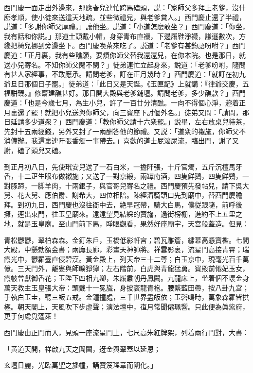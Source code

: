 西門慶一面走出外邊來，那應春兒連忙跨馬磕頭，説：「家師父多拜上老爹，沒什麽孝順，使小徒來送這天地疏，並些微禮兒，與老爹賞人。」西門慶止還了半禮，説道：「多謝你師父厚禮。」讓他坐。説道：「小道怎麽敢坐？」西門慶道：「你坐，我有話和你説。」那道士頭戴小帽，身穿青布直裰，下邊履鞋淨襪，謙遜數次，方纔把椅兒挪到旁邊坐下。西門慶喚茶來吃了。説道：「老爹有甚鈞語吩咐？」西門慶道：「正月裏，我有些醮願，要煩你師父替我還還兒，在你本院。也是那日，就送小兒寄名。不知你師父閑不閑？」徒弟連忙立起身來，説道：「老爹吩咐，隨問有甚人家經事，不敢應承。請問老爹，訂在正月幾時？」西門慶道：「就訂在初九爺旦日那個日子罷。」徒弟道：「此日又是天誕。《玉匣記》上就講：『律爺交慶，五福駢臻。』修齋建醮甚好。那日開大殿與老爹鋪壇。請問老爹，多少醮款？」西門慶道：「也是今歲七月，為生小兒，許了一百廿分清醮。一向不得個心淨，趂着正月裏還了罷！就把小兒送與你師父，向三寳座下討個外名。」徒弟又問：「請問，那日延請多少道衆？」西門慶道：「教你師父請十六衆罷。」説畢，左右放桌兒待茶，先封十五兩經錢，另外又封了一兩酬答他的節禮。又説：「道衆的襯施，你師父不消備辦。我這裏連阡張香燭一事帶去。」喜歡的道士屁滚尿流，臨出門，謝了又謝，磕了頭兒又磕。

到正月初八日，先使玳安兒送了一石白米，一擔阡張，十斤官燭，五斤沉檀馬牙香，十二疋生眼布做襯施；又送了一對京緞，兩罈南酒，四隻鮮鵝，四隻鮮鷄，一對豚蹄，一脚羊肉，十兩銀子，與官哥兒寄名之禮。西門慶預先發帖兒，請下吳大舅、花大舅、應伯爵、謝希大，四位相陪。陳經濟騎頭口先到廟中，替西門慶瞻拜。到初九日，西門慶也沒往衙中去，絶早冠帶，騎大白馬，僕従跟隨，前呼後擁，逕出東門，往玉皇廟來。遠遠望見結綵的寳旛，過街榜棚，進約不上五里之地，就是玉皇廟。至山門前下馬，睜眼觀看，果然好座廟宇，天宫般蓋造。但見：

\begin{myquote}
青松鬱鬱，翠柏森森。金釘朱戶，玉橋低影軒宫；碧瓦雕簷，繡幕高懸寳檻。七間大殿，中懸勅額金書；兩廡長廊，彩畫天神帥將。祥雲影裏，流星門高接青霄；瑞霞光中，鬱羅臺直侵碧漢。黃金殿上，列天帝三十二尊；白玉京中，現毫光百千萬億。三天門外，離婁與師曠猙獰；左右階前，白虎與青龍猛勇。寳殿前僊妃玉女，霞帔曾獻御香花；玉陛下四相九卿，朱履肅朝丹鳳闕。九龍床上，坐着個不壞金身萬天教主玉皇張大帝：頭戴十一冕旒，身披衮龍青袍。腰繫藍田帶，按八卦九宫；手執白玉圭，聽三皈五戒。金鐘撞處，三千世界盡皈依；玉磬鳴時，萬象森羅皆拱極。朝天閣上，天風吹下步虚聲；演法壇中，亱月常聞僊珮響。只此便為眞紫府，更于何䖏覓蓬萊！
\end{myquote}

西門慶由正門而入，見頭一座流星門上，七尺高朱紅牌架，列着兩行門對，大書：

\begin{myquote}
「黄道天開，祥啟九天之閶闔，迓金輿翠蓋以延恩；

玄壇日麗，光臨萬聖之旙幢，誦寳笈瑤章而闡化。」
\end{myquote}

